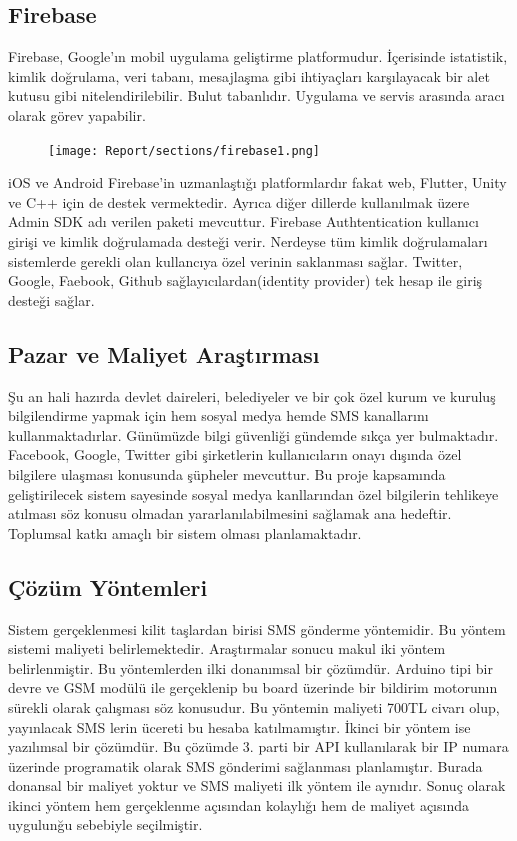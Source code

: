 \subsection{Firebase}
Firebase, Google'ın mobil uygulama geliştirme platformudur. İçerisinde istatistik, kimlik doğrulama, veri tabanı, mesajlaşma gibi ihtiyaçları karşılayacak bir alet kutusu gibi nitelendirilebilir. Bulut tabanlıdır. Uygulama ve servis arasında aracı olarak görev yapabilir.
\begin{figure}
    \centering
    \texttt{[image: Report/sections/firebase1.png]}
    \label{fig:mesh3}
\end{figure}
iOS ve Android Firebase'in uzmanlaştığı platformlardır fakat web, Flutter, Unity ve C++ için de destek vermektedir. Ayrıca diğer dillerde kullanılmak üzere Admin SDK adı verilen paketi mevcuttur.
Firebase Authtentication kullanıcı girişi ve kimlik doğrulamada desteği verir. Nerdeyse tüm kimlik doğrulamaları sistemlerde gerekli olan kullancıya özel verinin saklanması sağlar. Twitter, Google, Faebook, Github sağlayıcılardan(identity provider) tek hesap ile giriş desteği sağlar.
\subsection{Pazar ve Maliyet Araştırması}
Şu an hali hazırda devlet daireleri, belediyeler ve bir çok özel kurum ve kuruluş bilgilendirme yapmak için hem sosyal medya hemde SMS kanallarını kullanmaktadırlar. Günümüzde bilgi güvenliği gündemde sıkça yer bulmaktadır. Facebook, Google, Twitter gibi şirketlerin kullanıcıların onayı dışında özel bilgilere ulaşması konusunda şüpheler mevcuttur. Bu proje kapsamında geliştirilecek sistem sayesinde sosyal medya kanllarından özel bilgilerin tehlikeye atılması söz konusu olmadan yararlanılabilmesini sağlamak ana hedeftir. Toplumsal katkı amaçlı bir sistem olması planlamaktadır.
\newpage
\subsection{Çözüm Yöntemleri}
Sistem gerçeklenmesi kilit taşlardan birisi SMS gönderme yöntemidir. Bu yöntem sistemi maliyeti belirlemektedir. Araştırmalar sonucu makul iki yöntem belirlenmiştir. Bu yöntemlerden ilki donanımsal bir çözümdür. Arduino tipi bir devre ve GSM modülü ile gerçeklenip bu board üzerinde bir bildirim motorunın sürekli olarak çalışması söz konusudur. Bu yöntemin maliyeti 700TL civarı olup, yayınlacak SMS lerin ücereti bu hesaba katılmamıştır.
\newline
\newline
\noindent
İkinci bir yöntem ise yazılımsal bir çözümdür. Bu çözümde 3. parti bir API kullanılarak bir IP numara üzerinde programatik olarak SMS gönderimi sağlanması planlamıştır. Burada donansal bir maliyet yoktur ve SMS maliyeti ilk yöntem ile aynıdır. Sonuç olarak ikinci yöntem hem gerçeklenme açısından kolaylığı hem de maliyet açısında uygulunğu sebebiyle seçilmiştir.




